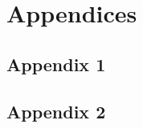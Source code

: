 \documentclass[11pt,a4paper,landscape]{article}
\begin{document}



\section{Appendices}
\subsection{Appendix 1}

\subsection{Appendix 2}

\end{document}
